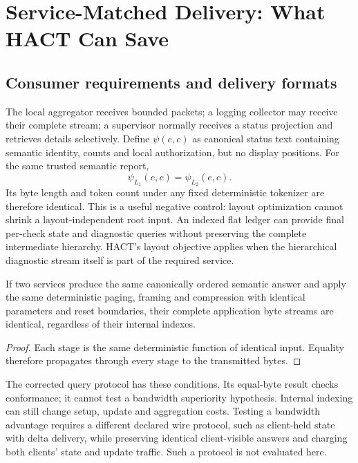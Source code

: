 \section{Service-Matched Delivery: What HACT Can Save}\label{sec:delivery}
\subsection{Consumer requirements and delivery formats}
The local aggregator receives bounded packets; a logging collector may receive their complete stream; a supervisor normally receives a status projection and retrieves details selectively. Define $\psi(e,c)$ as canonical status text containing semantic identity, counts and local authorization, but no display positions. For the same trusted semantic report,
\begin{equation}\label{eq:rootcontext}
 \psi_{L_1}(e,c)=\psi_{L_2}(e,c).
\end{equation}
Its byte length and token count under any fixed deterministic tokenizer are therefore identical. This is a useful negative control: layout optimization cannot shrink a layout-independent root input. An indexed flat ledger can provide final per-check state and diagnostic queries without preserving the complete intermediate hierarchy. HACT's layout objective applies when the hierarchical diagnostic stream itself is part of the required service.

\begin{proposition}\label{prop:codec-equality}
If two services produce the same canonically ordered semantic answer and
apply the same deterministic paging, framing and compression with identical
parameters and reset boundaries, their complete application byte streams
are identical, regardless of their internal indexes.
\end{proposition}
\begin{proof}
Each stage is the same deterministic function of identical input. Equality
therefore propagates through every stage to the transmitted bytes.
\end{proof}
The corrected query protocol has these conditions. Its equal-byte result
checks conformance; it cannot test a bandwidth superiority hypothesis.
Internal indexing can still change setup, update and aggregation costs.
Testing a bandwidth advantage requires a different declared wire protocol,
such as client-held state with delta delivery, while preserving identical
client-visible answers and charging both clients' state and update traffic.
Such a protocol is not evaluated here.

